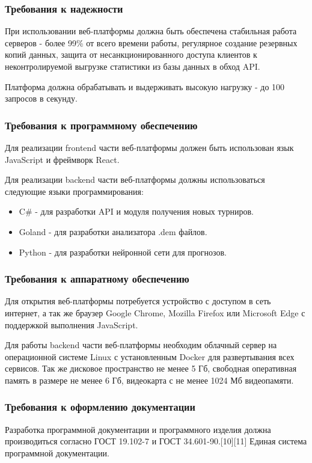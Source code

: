 \subsubsection{Требования к надежности}

При использовании веб-платформы должна быть обеспечена стабильная работа серверов - более 99\% от всего времени работы, регулярное создание резервных копий данных, защита от несанкционированного доступа клиентов к неконтролируемой выгрузке статистики из базы данных в обход API.

Платформа должна обрабатывать и выдерживать высокую нагрузку - до 100 запросов в секунду.

\subsubsection{Требования к программному обеспечению}

Для реализации frontend части веб-платформы должен быть использован язык JavaScript и фреймворк React. 

Для реализации backend части веб-платформы должны использоваться следующие языки программирования: 
\begin{itemize}
	\item C\# - для разработки API и модуля получения новых турниров.
	\item Goland - для разработки анализатора .dem файлов.
	\item Python - для разработки нейронной сети для прогнозов.
\end{itemize}

\subsubsection{Требования к аппаратному обеспечению}

Для открытия веб-платформы потребуется устройство с доступом в сеть интернет, а так же браузер Google Chrome, Mozilla Firefox или Microsoft Edge с поддержкой выполнения JavaScript.

Для работы backend части веб-платформы необходим облачный сервер на операционной системе Linux с установленным Docker для развертывания всех сервисов. Так же дисковое пространство не менее 5 Гб, свободная оперативная память в размере не менее 6 Гб, видеокарта с не менее 1024 Мб видеопамяти.

\subsubsection{Требования к оформлению документации}

Разработка программной документации и программного изделия должна производиться согласно ГОСТ 19.102-7 и ГОСТ 34.601-90.[10][11] Единая система программной документации.
